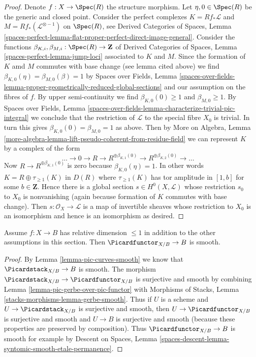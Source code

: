 \begin{proof}
\medskip\noindent
Denote $f : X \to \Spec(R)$ the structure morphism.
Let $\eta, 0 \in \Spec(R)$ be the generic and closed point.
Consider the perfect complexes
$K = Rf_*\mathcal{L}$ and $M = Rf_*(\mathcal{L}^{\otimes -1})$
on $\Spec(R)$, see Derived Categories of Spaces, Lemma
\ref{spaces-perfect-lemma-flat-proper-perfect-direct-image-general}.
Consider the functions
$\beta_{K, i}, \beta_{M, i} : \Spec(R) \to \mathbf{Z}$
of Derived Categories of Spaces, Lemma
\ref{spaces-perfect-lemma-jump-loci} associated to $K$ and $M$.
Since the formation of $K$ amd $M$ commutes with
base change (see lemma cited above) we find
$\beta_{K, 0}(\eta) = \beta_{M, 0}(\beta) = 1$ by
Spaces over Fields, Lemma
\ref{spaces-over-fields-lemma-proper-geometrically-reduced-global-sections}
and our assumption on the fibres of $f$.
By upper semi-continuity we find
$\beta_{K, 0}(0) \geq 1$ and $\beta_{M, 0} \geq 1$.
By 
Spaces over Fields, Lemma
\ref{spaces-over-fields-lemma-characterize-trivial-pic-integral}
we conclude that the restriction of $\mathcal{L}$
to the special fibre $X_0$ is trivial. In turn this gives
$\beta_{K, 0}(0) = \beta_{M, 0} = 1$ as above.
Then by More on Algebra, Lemma
\ref{more-algebra-lemma-lift-pseudo-coherent-from-residue-field}
we can represent $K$ by a complex of the form
$$
\ldots \to 0 \to R \to R^{\oplus \beta_{K, 1}(0)} \to
R^{\oplus \beta_{K, 2}(0)} \to \ldots
$$
Now $R \to R^{\oplus \beta_{K, 1}(0)}$ is zero
because $\beta_{K, 0}(\eta) = 1$. In other words
$K = R \oplus \tau_{\geq 1}(K)$ in $D(R)$ where $\tau_{\geq 1}(K)$
has tor amplitude in $[1, b]$ for some $b \in \mathbf{Z}$.
Hence there is a global section $s \in H^0(X, \mathcal{L})$
whose restriction $s_0$
to $X_0$ is nonvanishing (again because formation of $K$
commutes with base change). Then $s : \mathcal{O}_X \to \mathcal{L}$
is a map of invertible sheaves whose restriction to $X_0$
is an isomorphism and hence is an isomorphism as desired.
\end{proof}

\begin{lemma}
\label{lemma-pic-functor-curves-smooth}
Assume $f : X \to B$ has relative dimension $\leq 1$ in addition to
the other assumptions in this section. Then $\Picardfunctor_{X/B} \to B$
is smooth.
\end{lemma}

\begin{proof}
By Lemma \ref{lemma-pic-curves-smooth} we know that
$\Picardstack_{X/B} \to B$ is smooth. The morphism
$\Picardstack_{X/B} \to \Picardfunctor_{X/B}$ is surjective
and smooth by combining Lemma \ref{lemma-pic-gerbe-over-pic-functor} with
Morphisms of Stacks, Lemma \ref{stacks-morphisms-lemma-gerbe-smooth}.
Thus if $U$ is a scheme and $U \to \Picardstack_{X/B}$ is surjective
and smooth, then $U \to \Picardfunctor_{X/B}$ is surjective and smooth
and $U \to B$ is surjective and smooth (because these properties
are preserved by composition). Thus $\Picardfunctor_{X/B} \to B$
is smooth for example by
Descent on Spaces, Lemma
\ref{spaces-descent-lemma-syntomic-smooth-etale-permanence}.
\end{proof}







